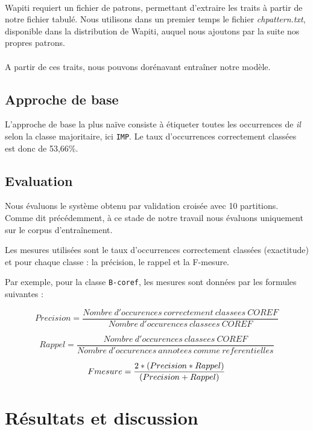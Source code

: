 \documentclass[a4paper,12pt]{article}
\begin{document}
\paragraph{}
Wapiti requiert un fichier de patrons, permettant d'extraire les traits à partir de notre fichier tabulé. Nous utilisons dans un premier temps le fichier \emph{chpattern.txt}, disponible dans la distribution de Wapiti, auquel nous ajoutons par la suite nos propres patrons.

\paragraph{}
A partir de ces traits, nous pouvons dorénavant entraîner notre modèle.


\subsection{Approche de base}

L'approche de base la plus naïve consiste à étiqueter toutes les occurrences de \og \textit{il} \fg{}  selon la classe majoritaire, ici \verb!IMP!.
Le taux d'occurrences correctement classées est donc de 53,66\%.

\subsection{Evaluation}

Nous évaluons le système obtenu par validation croisée avec 10 partitions. Comme dit précédemment, à ce stade de notre travail nous évaluons uniquement sur le corpus d'entraînement.

Les mesures utilisées sont le taux d'occurrences correctement classées (exactitude) et pour chaque classe : la précision, le rappel et la F-mesure.

Par exemple, pour la classe \verb!B-coref!, les mesures sont données par les formules suivantes :

\[ Precision = \frac{Nombre\ d'occurences\ correctement\ classees\ COREF}{Nombre\ d'occurences\ classees\ COREF} \]

\[ Rappel = \frac{Nombre\ d'occurences\ classees\ COREF}{Nombre\ d'occurences\ annotees\ comme\ referentielles} \]

\[ F\-mesure = \frac{2 * (Precision * Rappel)}{(Precision + Rappel)} \]


\section{Résultats et discussion}
\label{resultats}
\end{document}
